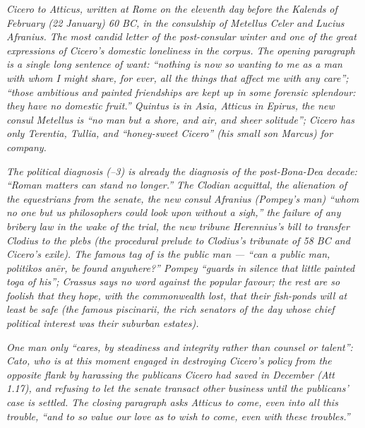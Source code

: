 
\textit{Cicero to Atticus, written at Rome on the eleventh
day before the Kalends of February (22 January) 60 BC, in
the consulship of Metellus Celer and Lucius Afranius. The
most candid letter of the post-consular winter and one of
the great expressions of Cicero's domestic loneliness in
the corpus. The opening paragraph is a single long sentence
of want: ``nothing is now so wanting to me as a man with
whom I might share, for ever, all the things that affect me
with any care''; ``those ambitious and painted friendships
are kept up in some forensic splendour: they have no
domestic fruit.'' Quintus is in Asia, Atticus in Epirus, the
new consul Metellus is ``no man but a shore, and air, and
sheer solitude''; Cicero has only Terentia, Tullia, and
``honey-sweet Cicero'' (his small son Marcus) for company.}

\textit{The political diagnosis (--3) is
already the diagnosis of the post-Bona-Dea decade:
``Roman matters can stand no longer.'' The Clodian
acquittal, the alienation of the equestrians from the
senate, the new consul Afranius (Pompey's man) ``whom no
one but us philosophers could look upon without a sigh,''
the failure of any bribery law in the wake of the trial,
the new tribune Herennius's bill to transfer Clodius to
the plebs (the procedural prelude to Clodius's tribunate
of 58 BC and Cicero's exile). The famous tag of
 is the public man --- ``can a public
man, \textit{politikos an\=er}, be found anywhere?''
Pompey ``guards in silence that little painted toga of
his''; Crassus says no word against the popular favour;
the rest are so foolish that they hope, with the
commonwealth lost, that their fish-ponds will at least
be safe (the famous \textit{piscinarii}, the rich
senators of the day whose chief political interest was
their suburban estates).}

\textit{One man only ``cares, by steadiness and integrity
rather than counsel or talent'': Cato, who is at this
moment engaged in destroying Cicero's policy from the
opposite flank by harassing the publicans Cicero had
saved in December (Att 1.17), and refusing to let the
senate transact other business until the publicans'
case is settled. The closing paragraph asks Atticus to
come, even into all this trouble, ``and to so value our
love as to wish to come, even with these troubles.''}

